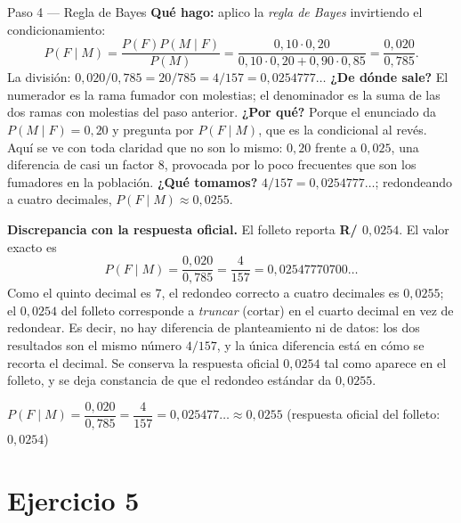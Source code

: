 \documentclass[11pt]{article}
\begin{document}
\begin{sol}
\begin{paso}{Paso 4 --- Regla de Bayes}
\textbf{Qué hago:} aplico la \emph{regla de Bayes} invirtiendo el condicionamiento:
\[
P(F\mid M)=\frac{P(F)P(M\mid F)}{P(M)}=\frac{0,10\cdot 0,20}{0,10\cdot 0,20+0,90\cdot 0,85}=\frac{0,020}{0,785}.
\]
La división: $0,020/0,785=20/785=4/157=0,0254777\ldots$
\textbf{¿De dónde sale?} El numerador es la rama fumador con molestias; el denominador es la suma de las dos ramas con molestias del paso anterior.
\textbf{¿Por qué?} Porque el enunciado da $P(M\mid F)=0,20$ y pregunta por $P(F\mid M)$, que es la condicional al revés. Aquí se ve con toda claridad que no son lo mismo: $0,20$ frente a $0,025$, una diferencia de casi un factor $8$, provocada por lo poco frecuentes que son los fumadores en la población.
\textbf{¿Qué tomamos?} $4/157=0,0254777\ldots$; redondeando a cuatro decimales, $P(F\mid M)\approx 0,0255$.
\end{paso}

\begin{nota}
\textbf{Discrepancia con la respuesta oficial.} El folleto reporta \textbf{R/ $0,0254$}. El valor exacto es
\[
P(F\mid M)=\frac{0,020}{0,785}=\frac{4}{157}=0,02547770700\ldots
\]
Como el quinto decimal es $7$, el redondeo correcto a cuatro decimales es $0,0255$; el $0,0254$ del folleto corresponde a \emph{truncar} (cortar) en el cuarto decimal en vez de redondear. Es decir, no hay diferencia de planteamiento ni de datos: los dos resultados son el mismo número $4/157$, y la única diferencia está en cómo se recorta el decimal. Se conserva la respuesta oficial $0,0254$ tal como aparece en el folleto, y se deja constancia de que el redondeo estándar da $0,0255$.
\end{nota}

\begin{resp}
$P(F\mid M)=\dfrac{0,020}{0,785}=\dfrac{4}{157}=0,025477\ldots\approx 0,0255$ \quad (respuesta oficial del folleto: $0,0254$)
\end{resp}

\end{sol}

\newpage
\section*{Ejercicio 5}
\end{document}
